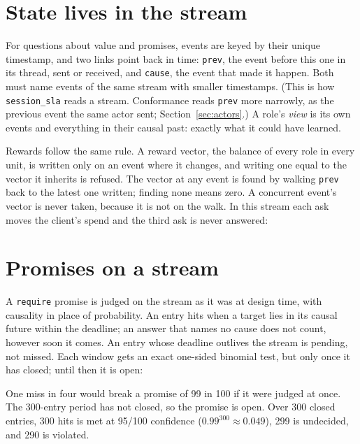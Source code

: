 

\section{State lives in the stream}

For questions about value and promises, events are keyed by their unique
timestamp, and two links point back in time: \texttt{prev}, the event before this one in its
thread, sent or received, and \texttt{cause}, the event that made it happen. Both must
name events of the same stream with smaller timestamps. (This is how
\texttt{session\_sla} reads a stream. Conformance reads \texttt{prev} more
narrowly, as the previous event the same actor sent; Section~\ref{sec:actors}.) A role's \emph{view} is its own events and everything
in their causal past: exactly what it could have learned.

Rewards follow the same rule. A reward vector, the balance of every role in every
unit, is written only on an event where it changes, and writing one equal to the
vector it inherits is refused. The vector at any event is found by walking
\texttt{prev} back to the latest one written; finding none means zero. A
concurrent event's vector is never taken, because it is not on the walk. In this
stream each ask moves the client's spend and the third ask is never answered:



\section{Promises on a stream}

A \texttt{require} promise is judged on the stream as it was at design time, with
causality in place of probability. An entry hits when a target lies in its causal
future within the deadline; an answer that names no cause does not count, however
soon it comes. An entry whose deadline outlives the stream is pending, not missed.
Each window gets an exact one-sided binomial test, but only once it has closed;
until then it is open:



One miss in four would break a promise of 99 in 100 if it were judged at once.
The 300-entry period has not closed, so the promise is open. Over 300 closed
entries, 300 hits is met at 95/100 confidence ($0.99^{300} \approx 0.049$), 299
is undecided, and 290 is violated.

